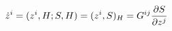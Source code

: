 \documentclass[preview]{standalone}
\begin{document}
\begin{align*}
\special{dvisvgm:raw <g id='unique000'>}\dot z^i=(z^i,H;S,H)=(z^i,S)_H=G^{ij}\frac{\partial S}{\partial z^j}\special{dvisvgm:raw </g>}
\end{align*}
\end{document}
